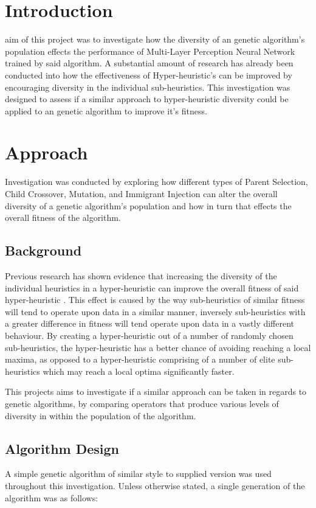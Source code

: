 
\section{Introduction}
	 aim of this project was to investigate how the diversity of an genetic algorithm's population effects the performance of Multi-Layer Perception Neural Network trained by said algorithm. 
	A substantial amount of research has already been conducted into how the effectiveness of Hyper-heuristic's can be improved by encouraging diversity in the individual sub-heuristics. This investigation was designed to assess if a similar approach to hyper-heuristic diversity could be applied to an genetic algorithm to improve it's fitness.
	
\section{Approach}
	Investigation was conducted by exploring how different types of Parent Selection, Child Crossover, Mutation, and Immigrant Injection can alter the overall diversity of a genetic algorithm's population and how in turn that effects the overall fitness of the algorithm.
	
	\subsection{Background}
		Previous research has shown evidence that increasing the diversity of the individual heuristics in  a hyper-heuristic can improve the overall fitness of said hyper-heuristic\cite{Hong16112004} \cite{hart2017constructing}. This effect is caused by the way sub-heuristics of similar fitness will tend to operate upon data in a similar manner, inversely sub-heuristics with a greater difference in fitness will tend operate upon data in a vastly different behaviour. By creating a hyper-heuristic out of a number of randomly chosen sub-heuristics, the hyper-heuristic has a better chance of avoiding reaching a local maxima, as opposed to a hyper-heuristic comprising of a number of elite sub-heuristics which may reach a local optima significantly faster.
		
		This projects aims to investigate if a similar approach can be taken in regards to genetic algorithms, by comparing operators that produce various levels of diversity in within the population of the algorithm.
	
	\subsection{Algorithm Design}
		A simple genetic algorithm of similar style to supplied version was used throughout this investigation. Unless otherwise stated, a single generation of the algorithm was as follows:

